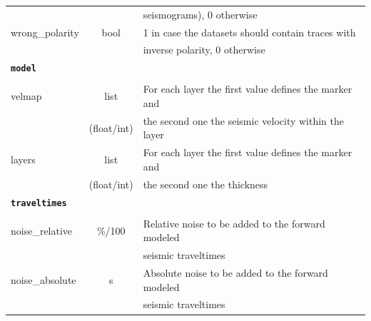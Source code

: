 \documentclass[a4paper,fleqn]{cas-sc}
\begin{document}
\begin{table}[]
\begin{tabular*}{\tblwidth}{@{} LCL@{}}
         & & seismograms), 0 otherwise \\
        wrong\_polarity & bool & 1 in case the datasets should contain traces with \\
         & & inverse polarity, 0 otherwise \\
        \midrule
        \textbf{\texttt{model}} & & \\
         & & \\
        velmap & list & For each layer the first value defines the marker and \\
         & (float/int) & the second one the seismic velocity within the layer \\
        layers & list & For each layer the first value defines the marker and \\
         & (float/int) & the second one the thickness \\
        \midrule
        \textbf{\texttt{traveltimes}} & & \\
         & & \\
        noise\_relative & \%/100 & Relative noise to be added to the forward modeled \\
      	 & & seismic traveltimes \\
        noise\_absolute & s & Absolute noise to be added to the forward modeled \\
         & & seismic traveltimes\\
        \bottomrule
    \end{tabular*}
    \label{tab:config}
\end{table}
\end{document}
